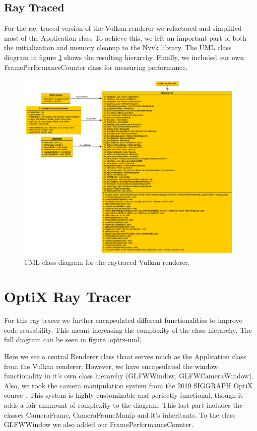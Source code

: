 \subsection{Ray Traced}
For the ray traced version of the Vulkan renderer we refactored and simplified most of the Application class To achieve this, we left an important part of both the initialization and memory cleanup to the Nvvk library. The UML class diagram in figure \ref{vulkan-rt-uml} shows the resulting hierarchy. Finally, we included our own FramePerformanceCounter class for measuring performance.

\begin{figure}[hbt!]
  \centering
  \includegraphics[width=\textwidth]{figuras/vulkan-rt-uml.png}
  \caption{UML class diagram for the raytraced Vulkan renderer.}
  \label{vulkan-rt-uml}
\end{figure}

\clearpage
\section{OptiX Ray Tracer}
For this ray tracer we further encapsulated different functionalities to improve code reusability. This meant increasing the complexity of the class hierarchy. The full diagram can be seen in figure \ref{optix-uml}. 

Here we see a central Renderer class thaat serves much as the Application class from the Vulkan renderer. However, we have encapsulated the window functionality in it's own class hierarchy (GLFWWindow, GLFWCameraWindow). Also, we took the camera manipulation system from the 2019 SIGGRAPH OptiX course \cite{OptixCourse}. This system is highly customizable and perfectly functional, though it adds a fair ammount of complexity to the diagram. This last part includes the classes CameraFrame, CameraFrameManip and it's inheritants. To the class GLFWWindow we also added our FramePerformanceCounter.

